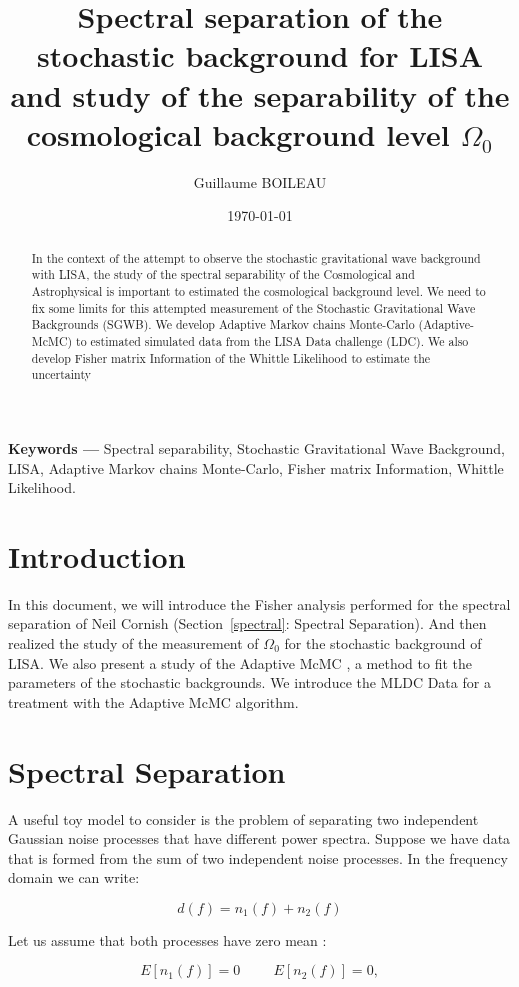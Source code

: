 \documentclass[a4paper,12pt]{article}
\title{Spectral separation of the stochastic background for LISA and study of the separability of the cosmological background level $\Omega_0$}
\author{Guillaume BOILEAU}
\affil{Laboratoire Artemis UMR - 7250 Electronic~address:~\texttt{guillaume.boileau@oca.eu}}
\date{\today}
\providecommand{\keywords}[1]
{
  \small	
  \textbf{Keywords ---} #1
}
\begin{document}
\maketitle
\begin{abstract}
In the context of the attempt to observe the stochastic gravitational wave background with LISA, the study of the spectral separability of the Cosmological and Astrophysical is important to estimated the cosmological background level. We need to fix some limits for this attempted measurement of the Stochastic Gravitational Wave Backgrounds (SGWB). We develop Adaptive Markov chains Monte-Carlo (Adaptive-McMC) to estimated simulated data from the LISA Data challenge (LDC). We also develop Fisher matrix Information of the Whittle Likelihood to estimate the uncertainty   
\end{abstract}

\keywords{Spectral separability, Stochastic Gravitational Wave Background, LISA, Adaptive Markov chains Monte-Carlo, Fisher matrix Information, Whittle Likelihood.}

\section{Introduction}
In this document, we will introduce the Fisher analysis performed for the spectral separation of Neil Cornish (Section~\ref{spectral}: Spectral Separation). And then realized the study of the measurement of $\Omega_0$ for the stochastic background of LISA. We also present a study of the Adaptive McMC , a method to fit the parameters of the stochastic backgrounds. We introduce the MLDC Data for a treatment with the Adaptive McMC algorithm.

\section{Spectral Separation \label{spectral}}
A useful toy model to consider is the problem of separating two independent Gaussian noise processes that have different power spectra. Suppose we have data that is formed from the sum of two independent noise processes. In the frequency domain we can write:

\begin{equation}
    d(f) = n_1(f) +n_2(f)
\end{equation}

Let us assume that both processes have zero mean : 

\begin{equation}
    E[n_1(f)] = 0 \hspace{1cm}  E[n_2 (f )] = 0 ,
\end{equation}
\end{document}
